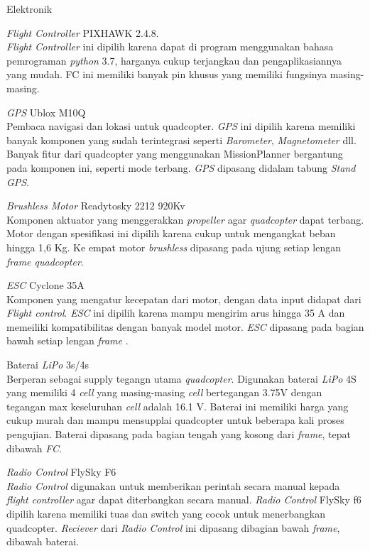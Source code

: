 \begin{packed_enum}
	\item Elektronik
	\begin{packed_item}
		\item [a.]\textit{Flight Controller} PIXHAWK 2.4.8.
		\\ \textit{Flight Controller} ini dipilih karena dapat di program menggunakan bahasa pemrograman \textit{python} 3.7, harganya cukup terjangkau dan pengaplikasiannya yang mudah. FC ini memiliki banyak pin khusus yang memiliki fungsinya masing-masing.
		\item [b.]\textit{GPS} Ublox M10Q
		\\ Pembaca navigasi dan lokasi untuk quadcopter. \textit{GPS} ini dipilih karena memiliki banyak komponen yang sudah terintegrasi seperti \textit{Barometer}, \textit{Magnetometer} dll. Banyak fitur dari quadcopter yang menggunakan MissionPlanner bergantung pada komponen ini, seperti mode terbang. \textit{GPS} dipasang didalam tabung \textit{Stand GPS}.
		\item [c.]\textit{Brushless Motor} Readytosky 2212 920Kv
		\\ Komponen aktuator yang menggerakkan \textit{propeller} agar \textit{quadcopter} dapat terbang. Motor dengan spesifikasi ini dipilih karena cukup untuk mengangkat beban hingga 1,6 Kg. Ke empat motor \textit{brushless} dipasang pada ujung setiap lengan \textit{frame quadcopter}.
		\item [d.]\textit{ESC} Cyclone 35A
		\\ Komponen yang mengatur kecepatan dari motor, dengan data input didapat dari \textit{Flight control}. \textit{ESC} ini dipilih karena mampu mengirim arus hingga 35 A dan memeiliki kompatibilitas dengan banyak model motor. \textit{ESC} dipasang pada bagian bawah setiap lengan \textit{frame} .
		\item [e.]Baterai \textit{LiPo} 3s/4s
		\\ Berperan sebagai supply tegangn utama \textit{quadcopter}. Digunakan baterai \textit{LiPo} 4S yang memiliki 4 \textit{cell} yang masing-masing \textit{cell} bertegangan 3.75V dengan tegangan max keseluruhan \textit{cell} adalah 16.1 V. Baterai ini memiliki harga yang cukup murah dan mampu mensupplai quadcopter untuk beberapa kali proses pengujian. Baterai dipasang pada bagian tengah yang kosong dari \textit{frame}, tepat dibawah \textit{FC}.
		\item [f.]\textit{Radio Control} FlySky F6
		\\ \textit{Radio Control} digunakan untuk memberikan perintah secara manual kepada \textit{flight controller} agar dapat diterbangkan secara manual. \textit{Radio Control} FlySky f6 dipilih karena memiliki tuas dan switch yang cocok untuk menerbangkan quadcopter. \textit{Reciever} dari \textit{Radio Control} ini dipasang dibagian bawah \textit{frame}, dibawah baterai.

\end{packed_item}
\end{packed_enum}
